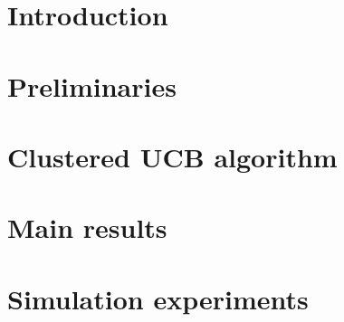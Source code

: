\documentclass[11pt,letterpaper,english]{article}
\begin{document}
\begin{abstract}

\end{abstract}

\section{Introduction}
\label{sec:intro}





\section{Preliminaries}
\label{sec:prelims}

	


\section{Clustered UCB algorithm}
\label{sec:clusucb}


\section{Main results}
\label{sec:results}



\section{Simulation experiments}
\label{sec:expts}

\end{document}
